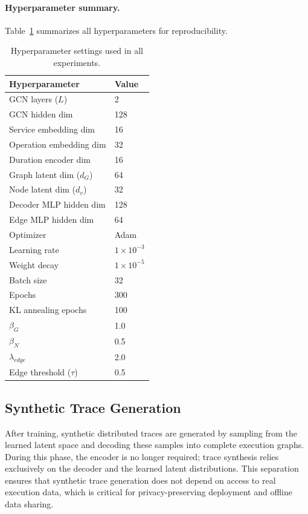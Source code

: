 \documentclass[sigconf,review]{acmart}
\begin{document}
{\paragraph{Hyperparameter summary.}
Table~\ref{tab:hyperparams} summarizes all hyperparameters for reproducibility.

\begin{table}
\centering
\begin{tabular}{ll}
\textbf{Hyperparameter} & \textbf{Value} \\
\hline
GCN layers ($L$) & 2 \\
GCN hidden dim & 128 \\
Service embedding dim & 16 \\
Operation embedding dim & 32 \\
Duration encoder dim & 16 \\
Graph latent dim ($d_G$) & 64 \\
Node latent dim ($d_v$) & 32 \\
Decoder MLP hidden dim & 128 \\
Edge MLP hidden dim & 64 \\
Optimizer & Adam \\
Learning rate & $1\times10^{-3}$ \\
Weight decay & $1\times10^{-5}$ \\
Batch size & 32 \\
Epochs & 300 \\
KL annealing epochs & 100 \\
$\beta_G$ & 1.0 \\
$\beta_N$ & 0.5 \\
$\lambda_{edge}$ & 2.0 \\
Edge threshold ($\tau$) & 0.5 \\
\end{tabular}
\caption{Hyperparameter settings used in all experiments.}
\label{tab:hyperparams}
\end{table}}

\subsection{Synthetic Trace Generation}
\label{sec:generation}

After training, synthetic distributed traces are generated by sampling from the learned latent space and decoding these samples into complete execution graphs. During this phase, the encoder is no longer required; trace synthesis relies exclusively on the decoder and the learned latent distributions. This separation ensures that synthetic trace generation does not depend on access to real execution data, which is critical for privacy-preserving deployment and offline data sharing.
\end{document}
